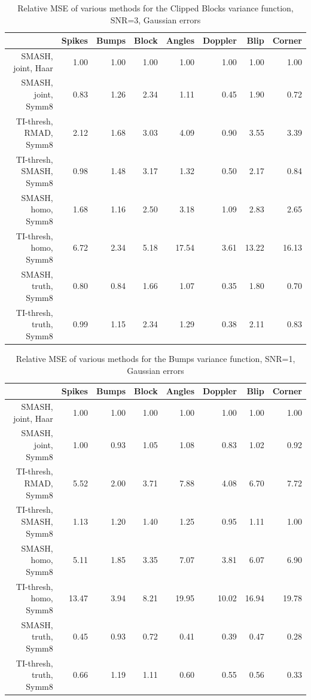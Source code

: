 \documentclass[12pt]{article}
\begin{document}
\begin{table}[ht]
\centering
\begin{tabular}{rrrrrrrr}
  \hline
 & Spikes & Bumps & Block & Angles & Doppler & Blip & Corner \\
  \hline
SMASH, joint, Haar & 1.00 & 1.00 & 1.00 & 1.00 & 1.00 & 1.00 & 1.00 \\
  SMASH, joint, Symm8 & 0.83 & 1.26 & 2.34 & 1.11 & 0.45 & 1.90 & 0.72 \\
  TI-thresh, RMAD, Symm8 & 2.12 & 1.68 & 3.03 & 4.09 & 0.90 & 3.55 & 3.39 \\
  TI-thresh, SMASH, Symm8 & 0.98 & 1.48 & 3.17 & 1.32 & 0.50 & 2.17 & 0.84 \\
  SMASH, homo, Symm8 & 1.68 & 1.16 & 2.50 & 3.18 & 1.09 & 2.83 & 2.65 \\
  TI-thresh, homo, Symm8 & 6.72 & 2.34 & 5.18 & 17.54 & 3.61 & 13.22 & 16.13 \\
  SMASH, truth, Symm8 & 0.80 & 0.84 & 1.66 & 1.07 & 0.35 & 1.80 & 0.70 \\
  TI-thresh, truth, Symm8 & 0.99 & 1.15 & 2.34 & 1.29 & 0.38 & 2.11 & 0.83 \\
   \hline
\end{tabular}
\caption{Relative MSE of various methods for the Clipped Blocks variance function, SNR=3, Gaussian errors}
\end{table}
\begin{table}[ht]
\centering
\begin{tabular}{rrrrrrrr}
  \hline
 & Spikes & Bumps & Block & Angles & Doppler & Blip & Corner \\
  \hline
SMASH, joint, Haar & 1.00 & 1.00 & 1.00 & 1.00 & 1.00 & 1.00 & 1.00 \\
  SMASH, joint, Symm8 & 1.00 & 0.93 & 1.05 & 1.08 & 0.83 & 1.02 & 0.92 \\
  TI-thresh, RMAD, Symm8 & 5.52 & 2.00 & 3.71 & 7.88 & 4.08 & 6.70 & 7.72 \\
  TI-thresh, SMASH, Symm8 & 1.13 & 1.20 & 1.40 & 1.25 & 0.95 & 1.11 & 1.00 \\
  SMASH, homo, Symm8 & 5.11 & 1.85 & 3.35 & 7.07 & 3.81 & 6.07 & 6.90 \\
  TI-thresh, homo, Symm8 & 13.47 & 3.94 & 8.21 & 19.95 & 10.02 & 16.94 & 19.78 \\
  SMASH, truth, Symm8 & 0.45 & 0.93 & 0.72 & 0.41 & 0.39 & 0.47 & 0.28 \\
  TI-thresh, truth, Symm8 & 0.66 & 1.19 & 1.11 & 0.60 & 0.55 & 0.56 & 0.33 \\
   \hline
\end{tabular}
\caption{Relative MSE of various methods for the Bumps variance function, SNR=1, Gaussian errors}
\end{table}
\end{document}
